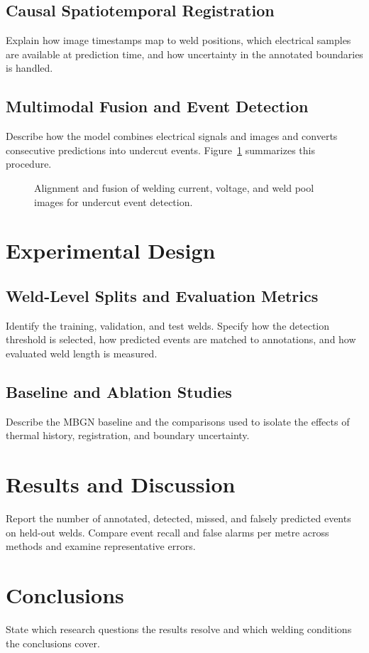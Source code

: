 \documentclass[11pt,a4paper]{article}
\begin{document}
\subsection{Causal Spatiotemporal Registration}
Explain how image timestamps map to weld positions, which electrical samples are available at prediction time, and how uncertainty in the annotated boundaries is handled.
\subsection{Multimodal Fusion and Event Detection}
Describe how the model combines electrical signals and images and converts consecutive predictions into undercut events. Figure~\ref{fig:overview} summarizes this procedure.

\begin{figure}[htbp]
  \centering
  \caption{Alignment and fusion of welding current, voltage, and weld pool images for undercut event detection.}
  \label{fig:overview}
\end{figure}

\section{Experimental Design}
\subsection{Weld-Level Splits and Evaluation Metrics}
Identify the training, validation, and test welds. Specify how the detection threshold is selected, how predicted events are matched to annotations, and how evaluated weld length is measured.
\subsection{Baseline and Ablation Studies}
Describe the MBGN baseline and the comparisons used to isolate the effects of thermal history, registration, and boundary uncertainty.

\section{Results and Discussion}
Report the number of annotated, detected, missed, and falsely predicted events on held-out welds. Compare event recall and false alarms per metre across methods and examine representative errors.

\section{Conclusions}
State which research questions the results resolve and which welding conditions the conclusions cover.



\end{document}
